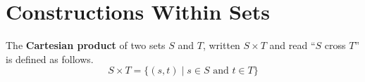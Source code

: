 \documentclass[11pt]{article}
\begin{document}
\section{Constructions Within Sets}
	The \textbf{Cartesian product} of two sets $S$ and $T$, written $S\times T$ and read ``$S$ cross $T$'' is defined as follows.
	\begin{equation}
		S\times T = \{(s,t)\mid s\in S \text{ and } t\in T\}
	\end{equation}

%		
%		


\end{document}
